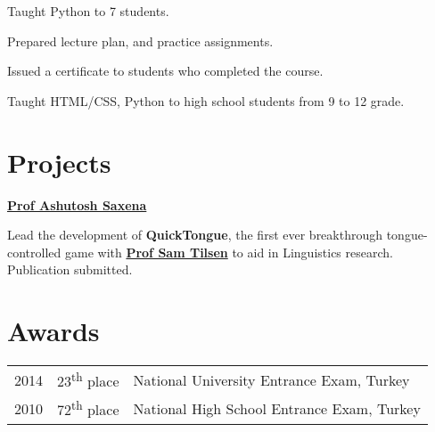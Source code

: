 \documentclass[]{deedy-resume-openfont}
\begin{document}
\begin{minipage}[t]{0.66\textwidth}
\begin{tightemize}
\item Taught Python to 7 students.
\item Prepared lecture plan, and practice assignments.
\item Issued a certificate to students who completed the course.
\end{tightemize}
\sectionsep

\begin{tightemize}
\item Taught HTML/CSS, Python to high school students from 9 to 12 grade.
\end{tightemize}
\sectionsep
\fi

\iftrue

\section{Projects}
\textbf{\href{https://github.com/NAUniversity/AlgorithmsBook}{Prof Ashutosh Saxena}} 
\sectionsep

Lead the development of \textbf{QuickTongue}, the first ever breakthrough tongue-controlled game with \textbf{\href{http://conf.ling.cornell.edu/~tilsen/}{Prof Sam Tilsen}} to aid in Linguistics research. Publication submitted.
\sectionsep
\fi

\iftrue

\section{Awards} 
\begin{tabular}{rll}
2014	     & 23\textsuperscript{th} place  & National University Entrance Exam, Turkey\\
2010	     & 72\textsuperscript{th} place  & National High School Entrance Exam, Turkey\\
\end{tabular}
\sectionsep
\fi



\end{minipage}
\end{document}
